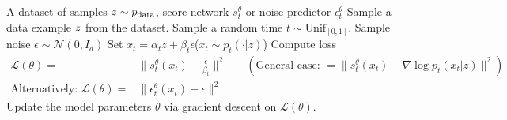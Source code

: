 \begin{algorithm}[h]
\caption{Score Matching Training Procedure for Gaussian probability path}
\label{alg:training_score_matching_gaussian_paths}
\begin{algorithmic}[1]
\REQUIRE A dataset of samples $z\sim p_{\rm{data}}$, score network $s_t^\theta$ or noise predictor $\epsilon_t^\theta$
    \STATE Sample a data example $z$ from the dataset.
    \STATE Sample a random time $t \sim \text{Unif}_{[0,1]}$.
    \STATE Sample noise $\epsilon\sim\mathcal{N}(0,I_d)$
    \STATE Set $x_t=\alpha_t z + \beta_t\epsilon$\hfill ($x_t\sim p_t(\cdot|z)$)
    \STATE Compute loss
    \begin{align*}
        \mathcal{L}(\theta) =& \|s_t^\theta(x_t)+\frac{\epsilon}{\beta_t}\|^2 \quad &(\text{General case: }=\|s_t^\theta(x_t)-\nabla\log p_t(x_t|z)\|^2)\\
    \text{Alternatively: }\mathcal{L}(\theta) =& \|\epsilon_t^\theta(x_t)-\epsilon\|^2
    \end{align*}
    \STATE Update the model parameters $\theta$ via gradient descent on $\mathcal{L}(\theta)$.
\ENDFOR
\end{algorithmic}
\end{algorithm}
